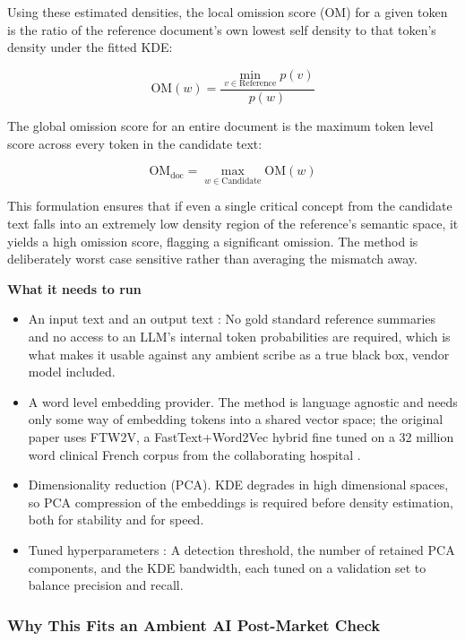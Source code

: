\documentclass[11pt,a4paper]{article}
\begin{document}
Using these estimated densities, the local omission score (OM) for a given token is the ratio of the reference document's own lowest self density to that token's density under the fitted KDE:

\begin{equation}
    \text{OM}(w) = \frac{\min_{v \in \text{Reference}} p(v)}{p(w)}
    \label{eq:om_scoped}
\end{equation}

The global omission score for an entire document is the maximum token level score across every token in the candidate text:

\begin{equation}
    \text{OM}_{\text{doc}} = \max_{w \in \text{Candidate}} \text{OM}(w)
    \label{eq:om_doc}
\end{equation}

This formulation ensures that if even a single critical concept from the candidate text falls into an extremely low density region of the reference's semantic space, it yields a high omission score, flagging a significant omission. The method is deliberately worst case sensitive rather than averaging the mismatch away.

\textbf{What it needs to run}

\begin{itemize}
    \item An input text and an output text : No gold standard reference summaries and no access to an LLM's internal token probabilities are required, which is what makes it usable against any ambient scribe as a true black box, vendor model included. 
    \item A word level embedding provider. The method is language agnostic and needs only some way of embedding tokens into a shared vector space; the original paper uses FTW2V, a FastText+Word2Vec hybrid fine tuned on a 32 million word clinical French corpus from the collaborating hospital \cite{oUKelmoun2025} . 
    \item Dimensionality reduction (PCA). KDE degrades in high dimensional spaces, so PCA compression of the embeddings is required before density estimation, both for stability and for speed. 
    \item Tuned hyperparameters : A detection threshold, the number of retained PCA components, and the KDE bandwidth, each tuned on a validation set to balance precision and recall.
\end{itemize}

\subsubsection{Why This Fits an Ambient AI Post-Market Check}
\end{document}
